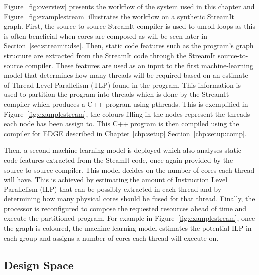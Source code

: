 Figure~\ref{fig:overview} presents the workflow of the system used in this chapter and Figure~\ref{fig:examplestream} illustrates the workflow on a synthetic StreamIt graph.
First, the source-to-source StreamIt compiler is used to unroll loops as this is often beneficial when cores are composed as will be seen later in Section~\ref{sec:streamit:dse}.
Then, static code features such as the program's graph structure are extracted from the StreamIt code through the StreamIt source-to-source compiler.
These features are used as an input to the first machine-learning model that determines how many threads will be required based on an estimate of Thread Level Parallelism (TLP) found in the program.
This information is used to partition the program into threads which is done by the StreamIt compiler which produces a C++ program using pthreads.
This is exemplified in Figure~\ref{fig:examplestream}, the colours filling in the nodes represent the threads each node has been assign to.
This C++ program is then compiled using the compiler for EDGE described in Chapter~\ref{chp:setup} Section~\ref{chp:setup:comp}.

Then, a second machine-learning model is deployed which also analyses static code features extracted from the SteamIt code, once again provided by the source-to-source compiler.
This model decides on the number of cores each thread will have.
This is achieved by estimating the amount of Instruction Level Parallelism (ILP) that can be possibly extracted in each thread and by determining how many physical cores should be fused for that thread.
Finally, the processor is reconfigured to compose the requested resources ahead of time and execute the partitioned program.
For example in Figure~\ref{fig:examplestream}, once the graph is coloured, the machine learning model estimates the potential ILP in each group and assigns a number of cores each thread will execute on.

\subsection{Design Space}

